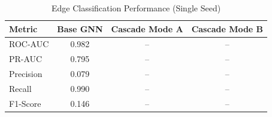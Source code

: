 \begin{table}[htbp]
\centering
\caption{Edge Classification Performance (Single Seed)}
\label{tab:single-seed-results}
\begin{tabular}{lccc}
\toprule
\textbf{Metric} & \textbf{Base GNN} & \textbf{Cascade Mode A} & \textbf{Cascade Mode B} \\
\midrule
ROC-AUC & 0.982 & -- & -- \\
PR-AUC & 0.795 & -- & -- \\
Precision & 0.079 & -- & -- \\
Recall & 0.990 & -- & -- \\
F1-Score & 0.146 & -- & -- \\
\bottomrule
    \end{tabular}
    \end{table}
    